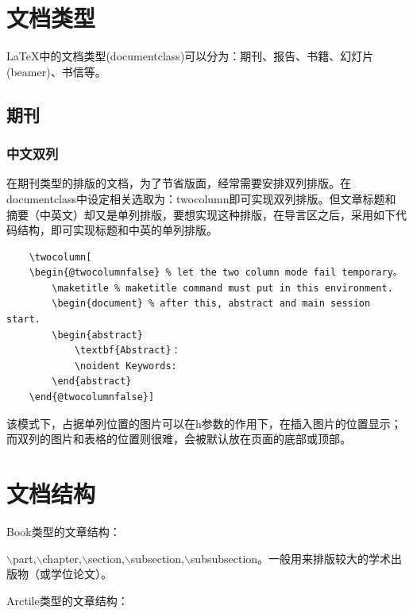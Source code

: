 \documentclass[12pt]{book}
\begin{document}
\section{文档类型}

\LaTeX{}中的文档类型(documentclass)可以分为：期刊、报告、书籍、幻灯片(beamer)、书信等。

\subsection{期刊}

\subsubsection{中文双列}
在期刊类型的排版的文档，为了节省版面，经常需要安排双列排版。在documentclass中设定相关选取为：twocolumn即可实现双列排版。但文章标题和摘要（中英文）却又是单列排版，要想实现这种排版，在导言区之后，采用如下代码结构，即可实现标题和中英的单列排版。

\begin{verbatim}
    \twocolumn[
    \begin{@twocolumnfalse} % let the two column mode fail temporary。
        \maketitle % maketitle command must put in this environment.
        \begin{document} % after this, abstract and main session start.
        \begin{abstract}
            \textbf{Abstract}：
            \noident Keywords:
        \end{abstract}
    \end{@twocolumnfalse}]     
\end{verbatim}
    
该模式下，占据单列位置的图片可以在h参数的作用下，在插入图片的位置显示；而双列的图片和表格的位置则很难，会被默认放在页面的底部或顶部。
    
\section{文档结构}


Book类型的文章结构：

$\backslash$part,$\backslash$chapter,$\backslash$section,$\backslash$subsection,$\backslash$subsubsection。一般用来排版较大的学术出版物（或学位论文）。

Arctile类型的文章结构：
\end{document}
